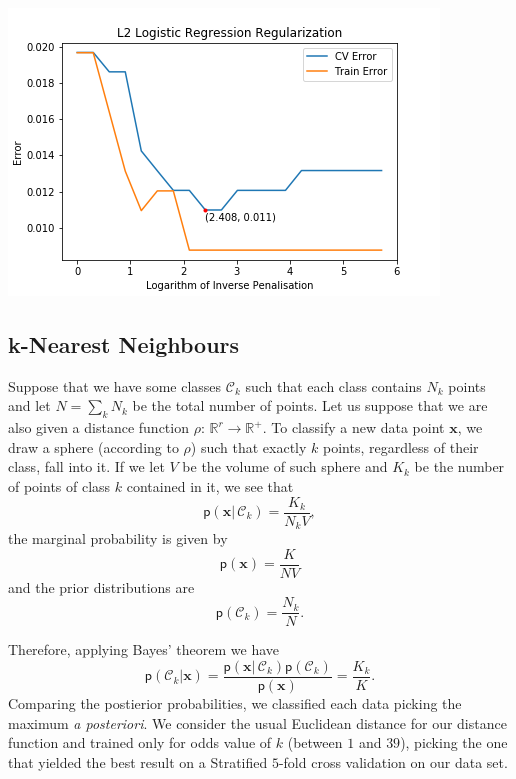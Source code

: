 \documentclass[a4paper]{article}
\begin{document}
\includegraphics{Best C value - L2 Logistic Regression.png}

\subsection{k-Nearest Neighbours}

Suppose that we have some classes $\mathcal{C}_{k}$ such that each
class contains $N_{k}$ points and let $N=\sum_{k}N_{k}$ be the total
number of points. Let us suppose that we are also given a distance
function $\rho:\,\mathbb{R}^{r}\rightarrow\mathbb{R}^{+}$. To classify
a new data point $\mathbf{x}$, we draw a sphere (according to $\rho$)
such that exactly $k$ points, regardless of their class, fall into
it. If we let $V$ be the volume of such sphere and $K_{k}$ be the
number of points of class $k$ contained in it, we see that 
\begin{equation}
\mathsf{p}\left(\mathbf{x}|\,\mathcal{C}_{k}\right)=\frac{K_{k}}{N_{k}V},\label{eq:-10}
\end{equation}
the marginal probability is given by 
\begin{equation}
\mathsf{p}\left(\mathbf{x}\right)=\frac{K}{NV}\label{eq:-11}
\end{equation}
and the prior distributions are 
\begin{equation}
\mathsf{p}\left(\mathcal{C}_{k}\right)=\frac{N_{k}}{N}.\label{eq:-12}
\end{equation}

Therefore, applying Bayes' theorem we have 
\begin{equation}
\mathsf{p}\left(\mathcal{C}_{k}|\mathbf{x}\right)=\frac{\mathsf{p}\left(\mathbf{x}|\,\mathcal{C}_{k}\right)\mathsf{p}\left(\mathcal{C}_{k}\right)}{\mathsf{p}\left(\mathbf{x}\right)}=\frac{K_{k}}{K}.\label{eq:-13}
\end{equation}
Comparing the postierior probabilities, we classified each data picking
the maximum \textit{a posteriori}. We consider the usual Euclidean
distance for our distance function and trained only for odds value
of $k$ (between $1$ and $39$), picking the one that yielded the
best result on a Stratified $5$-fold cross validation on our data
set.
\end{document}
